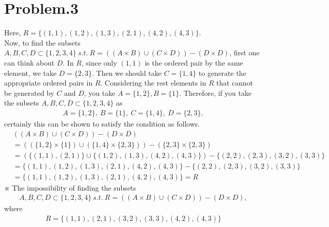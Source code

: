 \documentclass[12pt]{article}
\begin{document}
\section*{Problem.3}
Here, $R = \{(1,1),(1,2),(1,3),(2,1),(4,2),(4,3)\}$.\\[1em]
Now, to find the subsets $A, B, C, D \subset \{1, 2, 3, 4\}~s.t.~ R = ((A \times B) \cup (C \times D)) - (D \times D)$, first one can think about $D$.
In $R$, since only $(1,1)$ is the ordered pair by the same element, we take $D = \{2, 3\}$. Then we should take $C = \{1, 4\}$ to generate the appropriate ordered pairs in $R$. Considering the rest elements in $R$ that cannot be generated by $C$ and $D$, you take $A = \{1,2\}, B = \{1\}$.
Therefore, if you take the subsets $A, B, C, D \subset \{1, 2, 3, 4\}$ as
\begin{gather*}
A = \{1,2\},~B = \{1\},~C = \{1, 4\},~D = \{2, 3\},
\end{gather*}
certainly this can be shown to satisfy the condition as follows.
\begin{align*}
&((A \times B) \cup (C \times D)) - (D \times D)\\[1em]
&= ((\{1,2\} \times \{1\}) \cup (\{1, 4\} \times \{2, 3\})) - (\{2, 3\} \times \{2, 3\})\\[1em]
&= (\{(1,1),(2,1)\} \cup \{(1,2),(1,3),(4,2),(4,3)\}) - \{(2,2),(2,3),(3,2),(3,3)\}\\[1em]
&= \{(1,1),(1,2),(1,3),(2,1),(4,2),(4,3)\} - \{(2,2),(2,3),(3,2),(3,3)\}\\[1em]
&= \{(1,1),(1,2),(1,3),(2,1),(4,2),(4,3)\} = R
\end{align*}
※ The impossibility of finding the subsets\\[1em]
\begin{gather*}
A, B, C, D \subset \{1, 2, 3, 4\}~s.t.~ R = ((A \times B) \cup (C \times D)) - (D \times D),
\end{gather*}
where
\begin{gather*}
R = \{(1,1),(2,1),(3,2),(3,3),(4,2),(4,3)\}
\end{gather*}
\end{document}
